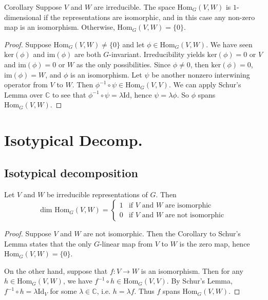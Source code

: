\begin{frame}
\begin{block}{Corollary}
Suppose $V$ and $W$ are irreducible. The space $\text{Hom}_G(V,W)$ is $1$-dimensional if the representations are isomorphic, and in this case any non-zero map is an isomorphism. Otherwise,  $\text{Hom}_G(V,W)=\{0\}$.
\end{block}
\begin{proof}
Suppose  $\text{Hom}_G(V,W) \neq \{0\}$ and let $\phi \in \text{Hom}_G(V,W)$. We have seen $\text{ker}(\phi)$ and $\text{im}(\phi)$ are both $G$-invariant.
Irreducibility yields $\text{ker}(\phi) = 0$ or $V$ and $\text{im}(\phi) = 0$ or $W$ as the only possibilities.  Since $\phi \neq 0$, then $\text{ker}(\phi)=0$, $\text{im}(\phi)=W$, and $\phi$ is an isomorphism.  
Let $\psi$ be another nonzero interwining operator from $V$ to $W$.  Then $\phi ^{-1} \circ \psi \in \text{Hom}_G (V,V)$.  We can apply Schur's Lemma over $\mathbb{C}$ to see that $\phi ^{-1} \circ \psi = \lambda \text{Id}$, hence $\psi = \lambda \phi$.  So $\phi$ spans $\text{Hom}_G(V,W)$.
\end{proof}
\end{frame}

\section{Isotypical Decomp.}
\subsection{Isotypical decomposition}
\begin{frame}
\begin{proposition}
Let $V$ and $W$ be irreducible representations of $G$.  Then
\[ \text{dim Hom}_G (V,W) =  \begin{cases} 
1 & \mbox{if $V$ and $W$ are isomorphic}  \\
0 &\mbox{if $V$ and $W$ are not isomorphic}
\end{cases} \]
\end{proposition}
\begin{proof}
Suppose $V$ and $W$ are not isomorphic.  Then the Corollary to Schur's Lemma states that the only $G$-linear map from $V$ to $W$ is the zero map, hence $\text{Hom}_G(V,W) = \{ 0 \} $.

On the other hand, suppose that $f \colon V \to W$ is an isomorphism.  Then for any $h \in \text{Hom}_G(V,W)$, we have $f^{-1} \circ h \in \text{Hom}_G(V,V)$.  By Schur's Lemma, $f^{-1} \circ h = \lambda \text{Id}_V$ for some $\lambda \in \mathbb{C}$, i.e. $h = \lambda f$.  Thus $f$  spans $\text{Hom}_G(V,W)$.
\end{proof}
\end{frame}

